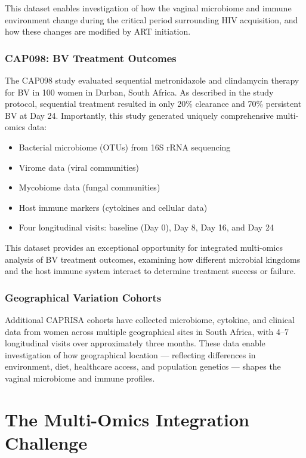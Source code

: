 \documentclass[12pt,a4paper]{report}
\begin{document}
This dataset enables investigation of how the vaginal microbiome and immune environment change during the critical period surrounding HIV acquisition, and how these changes are modified by ART initiation.

\subsubsection{CAP098: BV Treatment Outcomes}

The CAP098 study evaluated sequential metronidazole and clindamycin therapy for BV in 100 women in Durban, South Africa. As described in the study protocol, sequential treatment resulted in only 20\% clearance and 70\% persistent BV at Day 24. Importantly, this study generated uniquely comprehensive multi-omics data:
\begin{itemize}
    \item Bacterial microbiome (OTUs) from 16S rRNA sequencing
    \item Virome data (viral communities)
    \item Mycobiome data (fungal communities)
    \item Host immune markers (cytokines and cellular data)
    \item Four longitudinal visits: baseline (Day 0), Day 8, Day 16, and Day 24
\end{itemize}

This dataset provides an exceptional opportunity for integrated multi-omics analysis of BV treatment outcomes, examining how different microbial kingdoms and the host immune system interact to determine treatment success or failure.

\subsubsection{Geographical Variation Cohorts}

Additional CAPRISA cohorts have collected microbiome, cytokine, and clinical data from women across multiple geographical sites in South Africa, with 4--7 longitudinal visits over approximately three months. These data enable investigation of how geographical location --- reflecting differences in environment, diet, healthcare access, and population genetics --- shapes the vaginal microbiome and immune profiles.

\section{The Multi-Omics Integration Challenge}
\end{document}
